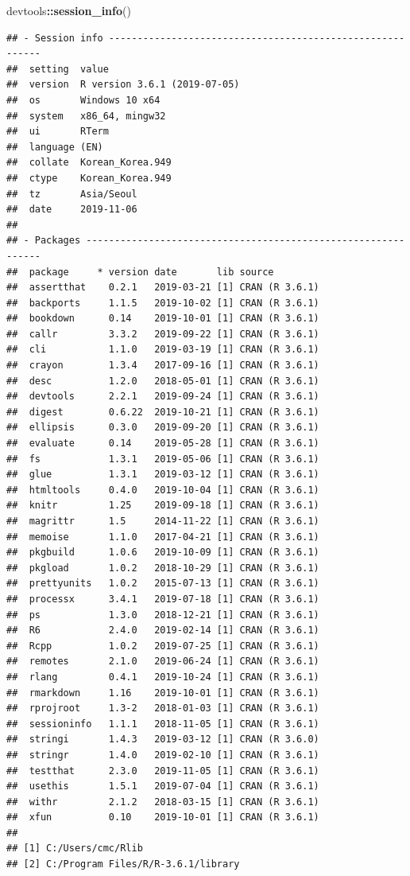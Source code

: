 \documentclass[12pt,]{krantz}
\newenvironment{Shaded}{\begin{snugshade}}{\end{snugshade}}
\newcommand{\KeywordTok}[1]{\textcolor[rgb]{0.13,0.29,0.53}{\textbf{#1}}}
\newcommand{\NormalTok}[1]{#1}
\newcommand{\OperatorTok}[1]{\textcolor[rgb]{0.81,0.36,0.00}{\textbf{#1}}}
\begin{document}
\begin{Shaded}
\begin{Highlighting}[]
\NormalTok{devtools}\OperatorTok{::}\KeywordTok{session_info}\NormalTok{()}
\end{Highlighting}
\end{Shaded}

\begin{verbatim}
## - Session info ----------------------------------------------------------
##  setting  value                       
##  version  R version 3.6.1 (2019-07-05)
##  os       Windows 10 x64              
##  system   x86_64, mingw32             
##  ui       RTerm                       
##  language (EN)                        
##  collate  Korean_Korea.949            
##  ctype    Korean_Korea.949            
##  tz       Asia/Seoul                  
##  date     2019-11-06                  
## 
## - Packages --------------------------------------------------------------
##  package     * version date       lib source        
##  assertthat    0.2.1   2019-03-21 [1] CRAN (R 3.6.1)
##  backports     1.1.5   2019-10-02 [1] CRAN (R 3.6.1)
##  bookdown      0.14    2019-10-01 [1] CRAN (R 3.6.1)
##  callr         3.3.2   2019-09-22 [1] CRAN (R 3.6.1)
##  cli           1.1.0   2019-03-19 [1] CRAN (R 3.6.1)
##  crayon        1.3.4   2017-09-16 [1] CRAN (R 3.6.1)
##  desc          1.2.0   2018-05-01 [1] CRAN (R 3.6.1)
##  devtools      2.2.1   2019-09-24 [1] CRAN (R 3.6.1)
##  digest        0.6.22  2019-10-21 [1] CRAN (R 3.6.1)
##  ellipsis      0.3.0   2019-09-20 [1] CRAN (R 3.6.1)
##  evaluate      0.14    2019-05-28 [1] CRAN (R 3.6.1)
##  fs            1.3.1   2019-05-06 [1] CRAN (R 3.6.1)
##  glue          1.3.1   2019-03-12 [1] CRAN (R 3.6.1)
##  htmltools     0.4.0   2019-10-04 [1] CRAN (R 3.6.1)
##  knitr         1.25    2019-09-18 [1] CRAN (R 3.6.1)
##  magrittr      1.5     2014-11-22 [1] CRAN (R 3.6.1)
##  memoise       1.1.0   2017-04-21 [1] CRAN (R 3.6.1)
##  pkgbuild      1.0.6   2019-10-09 [1] CRAN (R 3.6.1)
##  pkgload       1.0.2   2018-10-29 [1] CRAN (R 3.6.1)
##  prettyunits   1.0.2   2015-07-13 [1] CRAN (R 3.6.1)
##  processx      3.4.1   2019-07-18 [1] CRAN (R 3.6.1)
##  ps            1.3.0   2018-12-21 [1] CRAN (R 3.6.1)
##  R6            2.4.0   2019-02-14 [1] CRAN (R 3.6.1)
##  Rcpp          1.0.2   2019-07-25 [1] CRAN (R 3.6.1)
##  remotes       2.1.0   2019-06-24 [1] CRAN (R 3.6.1)
##  rlang         0.4.1   2019-10-24 [1] CRAN (R 3.6.1)
##  rmarkdown     1.16    2019-10-01 [1] CRAN (R 3.6.1)
##  rprojroot     1.3-2   2018-01-03 [1] CRAN (R 3.6.1)
##  sessioninfo   1.1.1   2018-11-05 [1] CRAN (R 3.6.1)
##  stringi       1.4.3   2019-03-12 [1] CRAN (R 3.6.0)
##  stringr       1.4.0   2019-02-10 [1] CRAN (R 3.6.1)
##  testthat      2.3.0   2019-11-05 [1] CRAN (R 3.6.1)
##  usethis       1.5.1   2019-07-04 [1] CRAN (R 3.6.1)
##  withr         2.1.2   2018-03-15 [1] CRAN (R 3.6.1)
##  xfun          0.10    2019-10-01 [1] CRAN (R 3.6.1)
## 
## [1] C:/Users/cmc/Rlib
## [2] C:/Program Files/R/R-3.6.1/library
\end{verbatim}
\end{document}
